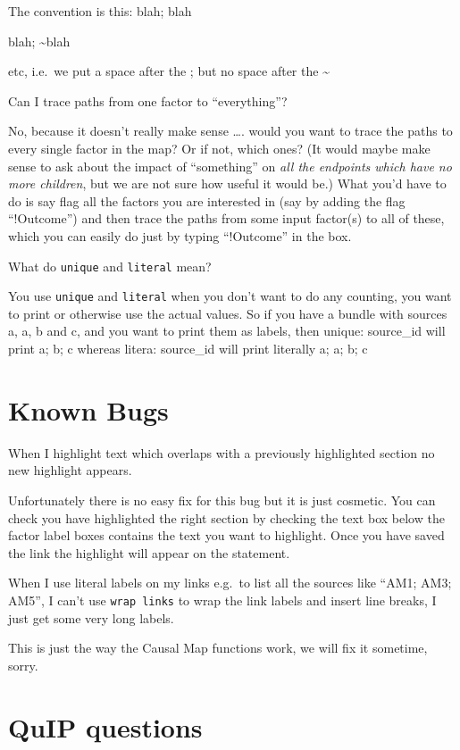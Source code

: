 \documentclass[
]{book}
\begin{document}
The convention is this: blah; blah

blah; \textasciitilde blah

etc, i.e.~we put a space after the ; but no space after the \textasciitilde{}

Can I trace paths from one factor to ``everything''?

No, because it doesn't really make sense \ldots. would you want to trace the paths to every single factor in the map? Or if not, which ones? (It would maybe make sense to ask about the impact of ``something'' on \emph{all the endpoints which have no more children}, but we are not sure how useful it would be.) What you'd have to do is say flag all the factors you are interested in (say by adding the flag ``!Outcome'') and then trace the paths from some input factor(s) to all of these, which you can easily do just by typing ``!Outcome'' in the box.

What do \texttt{unique} and \texttt{literal} mean?

You use \texttt{unique} and \texttt{literal} when you don't want to do any counting, you want to print or otherwise use the actual values. So if you have a bundle with sources a, a, b and c, and you want to print them as labels, then unique: source\_id will print a; b; c whereas litera: source\_id will print literally a; a; b; c

\hypertarget{known-bugs}{%
\section{Known Bugs}\label{known-bugs}}

When I highlight text which overlaps with a previously highlighted section no new highlight appears.

Unfortunately there is no easy fix for this bug but it is just cosmetic. You can check you have highlighted the right section by checking the text box below the factor label boxes contains the text you want to highlight. Once you have saved the link the highlight will appear on the statement.

When I use literal labels on my links e.g.~to list all the sources like ``AM1; AM3; AM5'', I can't use \texttt{wrap\ links} to wrap the link labels and insert line breaks, I just get some very long labels.

This is just the way the Causal Map functions work, we will fix it sometime, sorry.

\hypertarget{quip-questions}{%
\section{QuIP questions}\label{quip-questions}}
\end{document}
